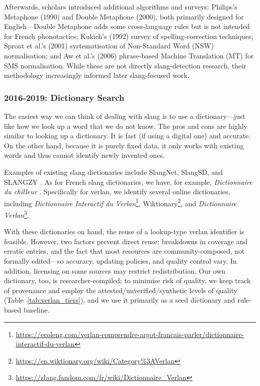 \documentclass[12pt]{article}
\begin{document}
Afterwards, scholars introduced additional algorithms and surveys: Philips's Metaphone (1990) and Double Metaphone (2000), both primarily designed for English\;---\;Double Metaphone adds some cross-language rules but is not intended for French phonotactics; Kukich's (1992) survey of spelling-correction techniques; Sproat et al.'s (2001) systematisation of Non-Standard Word (NSW) normalisation; and Aw et al.'s (2006) phrase-based Machine Translation (MT) for SMS normalisation. \cite{philips1990metaphone,philips2000doublemetaphone,kukich1992techniques,sproat2001normalization,aw2006phrase} While these are not directly slang-detection research, their methodology increasingly informed later slang-focused work.



\subsubsection{2016-2019: Dictionary Search}

The easiest way we can think of dealing with slang is to use a dictionary\;---\;just like how we look up a word that we do not know. The pros and cons are highly similar to looking up a dictionary. It is fast (if using a digital one) and accurate. On the other hand, because it is purely fixed data, it only works with existing words and thus cannot identify newly invented ones.

Examples of existing slang dictionaries include SlangNet, SlangSD, and SLANGZY \cite{dhuliawala2016slangnet, wu2018slangsd, gupta2019slangzy}. As for French slang dictionaries, we have, for example, \textit{Dictionnaire du chilleur} \cite{dictionnaire2024chilleur}. Specifically for verlan, we identify several online dictionaries, including \textit{Dictionnaire Interactif du Verlan}\footnote{\url{https://ecoleng.com/verlan-comprendre-argot-francais-parler/dictionnaire-interactif-du-verlan}}, Wiktionary\footnote{\url{https://en.wiktionary.org/wiki/Category\%3AVerlan}}, and \textit{Dictionnaire Verlan}\footnote{\url{https://zlang.fandom.com/fr/wiki/Dictionnaire_Verlan}}.

With these dictionaries on hand, the reuse of a lookup-type verlan identifier is feasible. However, two factors prevent direct reuse: breakdowns in coverage and erratic entries, and the fact that most resources are community-composed, not formally edited\;---\;so accuracy, updating policies, and quality control vary. In addition, licensing on some sources may restrict redistribution. Our own dictionary, too, is researcher-compiled; to minimise risk of quality, we keep track of provenance and employ the attested/unverified/synthetic levels of quality (Table~\ref{tab:verlan_tiers}), and we use it primarily as a seed dictionary and rule-based baseline.
\end{document}
